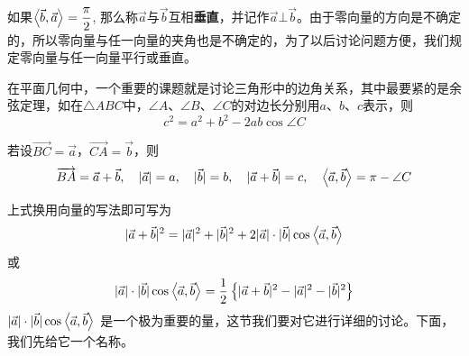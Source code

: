 \begin{figure}[htp]
    \centering
    \begin{minipage}[t]{0.48\textwidth}
    \centering
    \caption{}
    \end{minipage}
    \begin{minipage}[t]{0.48\textwidth}
    \centering
    \caption{}
    \end{minipage}
  \end{figure}

如果$\left\langle \vec{b},\vec{a} \right\rangle=\dfrac{\pi}{2}$, 那么称$\vec{a}$与$\vec{b}$互相\textbf{垂直}，并记作$\vec{a}\bot \vec{b}$。由于零向量的方向是不确定的，所以零向量与任一向量的夹角也是不确定的，为了以后讨论问题方便，我们规定零向量与任一向量平行或垂直。

在平面几何中，一个重要的课题就是讨论三角形中的边角关系，其中最要紧的是余弦定理，如在$\triangle ABC$中，$\angle A$、$\angle B$、$\angle C$的对边长分别用$a$、$b$、$c$表示，则
\[c^2=a^2+b^2-2ab\cos\angle C\]

若设$\Vec{BC}=\vec{a}$，$\Vec{CA}=\vec{b}$，则
\[\overrightarrow{BA}=\vec{a}+\vec{b},\quad |\vec{a}|=a,\quad |\vec{b}|=b,\quad |\vec{a}+\vec{b}|=c,\quad \left\langle \vec{a},\vec{b} \right\rangle=\pi-\angle C\]

上式换用向量的写法即可写为
\[|\vec{a}+\vec{b}|^2=|\vec{a}|^2+|\vec{b}|^2+2|\vec{a}|\cdot |\vec{b}|\cos\left\langle \vec{a},\vec{b} \right\rangle\]
或
\[|\vec{a}|\cdot |\vec{b}|\cos\left\langle \vec{a},\vec{b} \right\rangle=\dfrac{1}{2}\left\{|\vec{a}+\vec{b}|^2-|\vec{a}|^2-|\vec{b}|^2\right\}\]
$|\vec{a}|\cdot |\vec{b}|\cos\left\langle \vec{a},\vec{b} \right\rangle$
是一个极为重要的量，这节我们要对它进行详细的讨论。下面，我们先给它一个名称。

